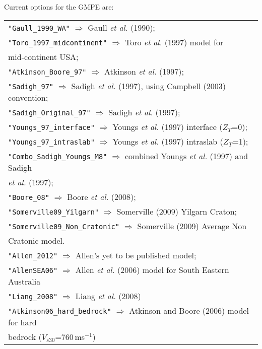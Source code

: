 Current options for the GMPE are: \\
\vspace{1em}
\begin{tabular}{|p{\textwidth}|}
\hline
\texttt{"Gaull\_1990\_WA"} $\Rightarrow$ Gaull \textit{et al.} (1990); \\
\texttt{"Toro\_1997\_midcontinent"}  $\Rightarrow$ Toro \textit{et al.} (1997) model for \\
    \hspace{8em} mid-continent USA; \\
\texttt{"Atkinson\_Boore\_97"}  $\Rightarrow$ Atkinson \textit{et al.} (1997); \\
\texttt{"Sadigh\_97"}  $\Rightarrow$ Sadigh \textit{et al.} (1997),
using Campbell (2003) convention; \\
\texttt{"Sadigh\_Original\_97"}  $\Rightarrow$ Sadigh \textit{et al.} (1997); \\
\texttt{"Youngs\_97\_interface"}  $\Rightarrow$ Youngs \textit{et al.} (1997) interface ($Z_T$=0); \\
\texttt{"Youngs\_97\_intraslab"}  $\Rightarrow$ Youngs \textit{et al.} (1997) intraslab ($Z_T$=1); \\
\texttt{"Combo\_Sadigh\_Youngs\_M8"}  $\Rightarrow$ combined Youngs \textit{et al.} (1997) and Sadigh \\
    \hspace{8em} \textit{et al.} (1997); \\
\texttt{"Boore\_08"}  $\Rightarrow$ Boore \textit{et al.} (2008); \\
\texttt{"Somerville09\_Yilgarn"} $\Rightarrow$ Somerville (2009) Yilgarn Craton; \\
\texttt{"Somerville09\_Non\_Cratonic"} $\Rightarrow$ Somerville (2009) Average Non \\
    \hspace{8em} Cratonic model. \\
\texttt{"Allen\_2012"} $\Rightarrow$ Allen's yet to be published model; \\
\texttt{"AllenSEA06"} $\Rightarrow$ Allen \textit{et al.} (2006) model for South Eastern Australia \\
\texttt{"Liang\_2008"} $\Rightarrow$ Liang \textit{et al.} (2008) \\
\texttt{"Atkinson06\_hard\_bedrock"} $\Rightarrow$ Atkinson and Boore (2006) model for hard \\
    \hspace{8em} bedrock ($V_{s30}$=760\,ms$^{-1}$)\\

\end{tabular}
